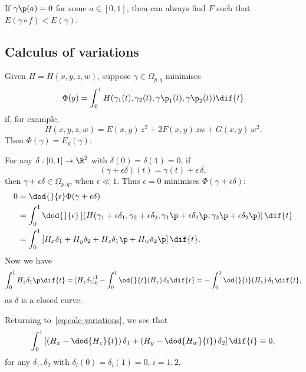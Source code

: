 \vspace{3pt}

\begin{note}
	If $\gamma\p(a) = 0$ for some $a\in[0,1]$, then can always find $F$ such that $E(\gamma \circ f) < E(\gamma)$.
\end{note}


\subsection{Calculus of variations} %
\label{sub:calculus_of_variations}

Given $H=H(x,y,z,w)$, suppose $\gamma\in\Omega_{p,q}$ minimises
\begin{equation*}
	\Phi(y) = \int_0^1 H(\gamma_1(t), \gamma_2(t), \gamma\p_1(t), \gamma\p_2(t)) \dif{t}
\end{equation*}
if, for example,
\begin{equation*}
	H(x,y,z,w) = E(x,y)\,z^2 + 2F(x,y) \, zw + G(x,y)\,w^2.
\end{equation*}
Then $\Phi(\gamma) = E_g(\gamma)$.

For any $\delta:[0,1] \to \R^2$ with $\delta(0)=\delta(1)=0$, if
\begin{equation*}
	(\gamma+\epsilon\delta)(t) = \gamma(t) + \epsilon\,\delta,
\end{equation*}
then $\gamma+\epsilon\delta \in \Omega_{p,q}$, when $\epsilon\ll1$. Thus $\epsilon=0$ minimises $\Phi(\gamma+\epsilon\delta)$:
\begin{align}
	0
	&= \dod{}{\epsilon}\Phi(\gamma+\epsilon\delta) \notag \\
	&= \int_0^1 \dod{}{\epsilon}\left[ (H(\gamma_1+\epsilon\delta_1, \gamma_2+\epsilon\delta_2, \gamma_1\p + \epsilon\delta_1\p, \gamma_2\p+\epsilon\delta_2\p) \right] \dif{t} \notag \\
	&= \int_0^1 \left[ H_x \delta_1 + H_y \delta_2 + H_z \delta_1\p + H_w \delta_2\p \right] \dif{t}. \label{eq:calc-variations}
\end{align}
Now we have
\begin{equation*}
	\int_0^1 H_z \delta_1\p \dif{t}
	= \left[ H_z \delta_1 \right]_0^1 - \int_0^1 \od{}{t}(H_z) \,\delta_1 \dif{t}
	= -\int_0^1 \od{}{t}(H_z)\,\delta_1 \dif{t},
\end{equation*}
as $\delta$ is a closed curve.

Returning to~\eqref{eq:calc-variations}, we see that
\begin{equation*}
	\int_0^1 \left[ \left( H_x - \dod{H_z}{t} \right)\delta_1 + \left( H_y - \dod{H_w}{t} \right)\delta_2 \right] \dif{t}
	\equiv 0,
\end{equation*}
for any $\delta_1,\delta_2$ with $\delta_i(0)=\delta_i(1) = 0$, $i=1,2$.

